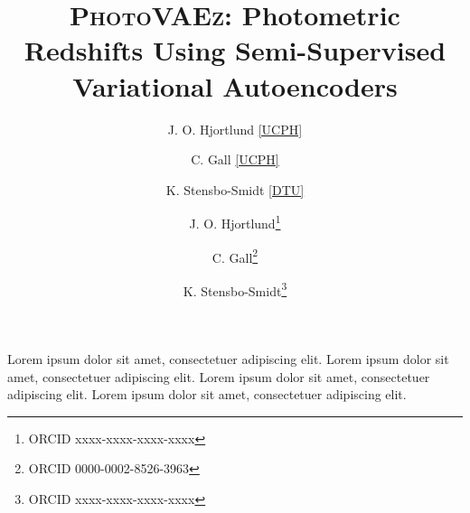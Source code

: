 \documentclass[bibyear]{aa}
\begin{document}
\title{\textsc{PhotoVAEz}: Photometric Redshifts Using Semi-Supervised Variational Autoencoders}

\author{
J. O. Hjortlund \ref{UCPH}
\and
C. Gall \ref{UCPH}
\and
K. Stensbo-Smidt \ref{DTU}
}

\author{
      J. O. Hjortlund\fnmsep\thanks{ORCID xxxx-xxxx-xxxx-xxxx}
      \and C. Gall\thanks{ORCID 0000-0002-8526-3963}
      \and K. Stensbo-Smidt\fnmsep\thanks{ORCID xxxx-xxxx-xxxx-xxxx}
      }

 {Lorem ipsum dolor sit amet, consectetuer adipiscing elit.} {Lorem ipsum dolor sit amet, consectetuer adipiscing elit.} {Lorem ipsum dolor sit amet, consectetuer adipiscing elit.} {Lorem ipsum dolor sit amet, consectetuer adipiscing elit.}

\maketitle










\end{document}

